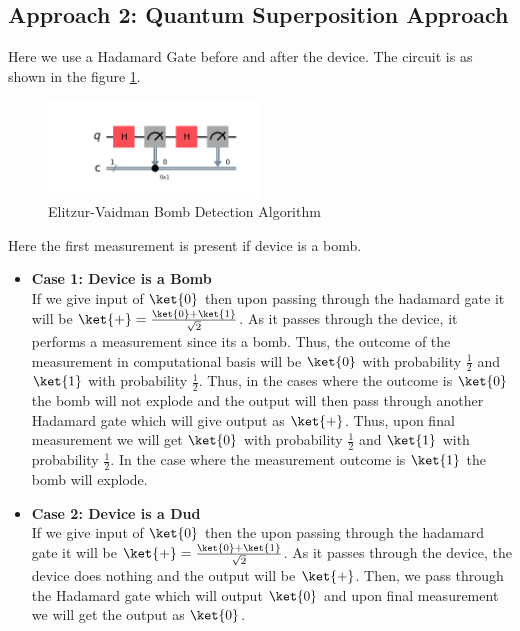 \documentclass[12pt, oneside]{book}
\theoremstyle{definition}
\theoremstyle{definition}
\theoremstyle{remark}
\begin{document}
\subsection{Approach 2: Quantum Superposition Approach}
    Here we use a Hadamard Gate before and after the device. The circuit is as shown in the figure \ref{fig:elitzur-vaidman}.
    \begin{figure}[H]
        \centering
        \includegraphics[width=0.5\textwidth]{../images/elitzur-vaidman.png}
        \caption{Elitzur-Vaidman Bomb Detection Algorithm}
        \label{fig:elitzur-vaidman}
    \end{figure}
    Here the first measurement is present if device is a bomb.
    \begin{itemize}
        \item \textbf{Case 1: Device is a Bomb}\\
        If we give input of $\ket{0}$ then upon passing through the hadamard gate it will be $\ket{+}=\frac{\ket{0}+\ket{1}}{\sqrt{2}}$. As it passes through the device,
        it performs a measurement since its a bomb. Thus, the outcome of the measurement in computational basis will be $\ket{0}$ with probability $\frac{1}{2}$ and $\ket{1}$ with probability $\frac{1}{2}$.
        Thus, in the cases where the outcome is $\ket{0}$ the bomb will not explode and the output will then pass through another Hadamard gate which will give output as $\ket{+}$. Thus, upon final measurement we will get 
        $\ket{0}$ with probability $\frac{1}{2}$ and $\ket{1}$ with probability $\frac{1}{2}$. In the case where the measurement outcome is $\ket{1}$ the bomb will explode.

        \item \textbf{Case 2: Device is a Dud}\\
        If we give input of $\ket{0}$ then the upon passing through the hadamard gate it will be $\ket{+}=\frac{\ket{0}+\ket{1}}{\sqrt{2}}$. As it passes through the device, the device does nothing and the output will be $\ket{+}$.
        Then, we pass through the Hadamard gate which will output $\ket{0}$ and upon final measurement we will get the output as $\ket{0}$.
    \end{itemize}
\end{document}
